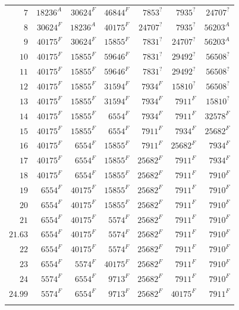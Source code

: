 \documentclass[11pt]{article}
\theoremstyle{definition}
\newcommand{\bottomrule}{\noalign{\vskip3pt\hrule height 0.8pt}}
\begin{document}
\begin{table}[p]
\begin{tabular}{@{}r|rrr|rrr@{}}
$7$ & $18236^{A}$ & $30624^{F}$ & $46844^{F}$ & $7853^{?}$ & $7935^{?}$ & $24707^{?}$\\
$8$ & $30624^{F}$ & $18236^{A}$ & $40175^{F}$ & $24707^{?}$ & $7935^{?}$ & $56203^{A}$\\
$9$ & $40175^{F}$ & $30624^{F}$ & $15855^{F}$ & $7831^{?}$ & $24707^{?}$ & $56203^{A}$\\
$10$ & $40175^{F}$ & $15855^{F}$ & $59646^{F}$ & $7831^{?}$ & $29492^{?}$ & $56508^{?}$\\
$11$ & $40175^{F}$ & $15855^{F}$ & $59646^{F}$ & $7831^{?}$ & $29492^{?}$ & $56508^{?}$\\
$12$ & $40175^{F}$ & $15855^{F}$ & $31594^{F}$ & $7934^{F}$ & $15810^{?}$ & $56508^{?}$\\
$13$ & $40175^{F}$ & $15855^{F}$ & $31594^{F}$ & $7934^{F}$ & $7911^{F}$ & $15810^{?}$\\
$14$ & $40175^{F}$ & $15855^{F}$ & $6554^{F}$ & $7934^{F}$ & $7911^{F}$ & $32578^{F}$\\
$15$ & $40175^{F}$ & $15855^{F}$ & $6554^{F}$ & $7911^{F}$ & $7934^{F}$ & $25682^{F}$\\
$16$ & $40175^{F}$ & $6554^{F}$ & $15855^{F}$ & $7911^{F}$ & $25682^{F}$ & $7934^{F}$\\
$17$ & $40175^{F}$ & $6554^{F}$ & $15855^{F}$ & $25682^{F}$ & $7911^{F}$ & $7934^{F}$\\
$18$ & $40175^{F}$ & $6554^{F}$ & $15855^{F}$ & $25682^{F}$ & $7911^{F}$ & $7910^{F}$\\
$19$ & $6554^{F}$ & $40175^{F}$ & $15855^{F}$ & $25682^{F}$ & $7911^{F}$ & $7910^{F}$\\
$20$ & $6554^{F}$ & $40175^{F}$ & $15855^{F}$ & $25682^{F}$ & $7911^{F}$ & $7910^{F}$\\
$21$ & $6554^{F}$ & $40175^{F}$ & $5574^{F}$ & $25682^{F}$ & $7911^{F}$ & $7910^{F}$\\
$21.63$ & $6554^{F}$ & $40175^{F}$ & $5574^{F}$ & $25682^{F}$ & $7911^{F}$ & $7910^{F}$\\
$22$ & $6554^{F}$ & $40175^{F}$ & $5574^{F}$ & $25682^{F}$ & $7911^{F}$ & $7910^{F}$\\
$23$ & $6554^{F}$ & $5574^{F}$ & $40175^{F}$ & $25682^{F}$ & $7911^{F}$ & $7910^{F}$\\
$24$ & $5574^{F}$ & $6554^{F}$ & $9713^{F}$ & $25682^{F}$ & $7911^{F}$ & $7910^{F}$\\
$24.99$ & $5574^{F}$ & $6554^{F}$ & $9713^{F}$ & $25682^{F}$ & $40175^{F}$ & $7911^{F}$\\
\bottomrule
\end{tabular}
\end{table}
\end{document}

